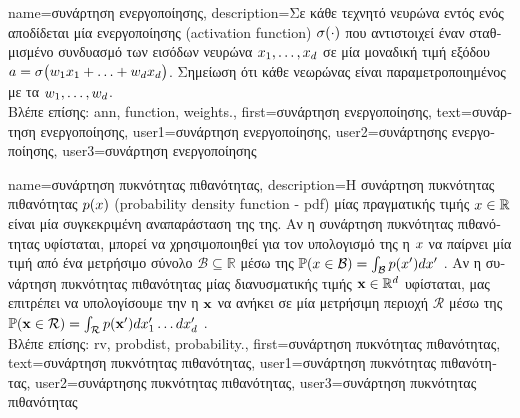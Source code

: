 {name={\foreignlanguage{greek}{συνάρτηση ενεργοποίησης}},
	description={\foreignlanguage{greek}{Σε κάθε τεχνητό νευρώνα εντός ενός} 
		 \foreignlanguage{greek}{αποδίδεται μία}  \foreignlanguage{greek}{ενεργοποίησης} (activation function)   
		$\sigma(\cdot)$ \foreignlanguage{greek}{που αντιστοιχεί έναν σταθμισμένο συνδυασμό των εισόδων 
		νευρώνα} $x_{1}, \ldots, x_{d}$ \foreignlanguage{greek}{σε μία μοναδική τιμή εξόδου} 
		$a = \sigma\big(w_{1} x_{1}+\ldots+w_{d} x_{d} \big)$. 
		\foreignlanguage{greek}{Σημείωση ότι κάθε νεωρώνας είναι παραμετροποιημένος με τα} 
		 $w_{1}, \ldots, w_{d}$.\\
		\foreignlanguage{greek}{Βλέπε επίσης:} \gls{ann}, \gls{function}, \gls{weights}.},
	first={\foreignlanguage{greek}{συνάρτηση ενεργοποίησης}},
	text={\foreignlanguage{greek}{συνάρτηση ενεργοποίησης}},
	user1={\foreignlanguage{greek}{συνάρτηση ενεργοποίησης}}, %
	user2={\foreignlanguage{greek}{συνάρτησης ενεργοποίησης}}, %
	user3={\foreignlanguage{greek}{συνάρτηση ενεργοποίησης}} %
}

{name={\foreignlanguage{greek}{συνάρτηση πυκνότητας πιθανότητας}},
	description={\foreignlanguage{greek}{Η συνάρτηση πυκνότητας πιθανότητας} 
		$p(x)$ (probability density function - pdf) \foreignlanguage{greek}{μίας}  \foreignlanguage{greek}{πραγματικής τιμής 
		$x \in \mathbb{R}$ είναι μία συγκεκριμένη αναπαράσταση της}  \foreignlanguage{greek}{της. 
		Αν η συνάρτηση πυκνότητας πιθανότητας υφίσταται, μπορεί να χρησιμοποιηθεί για τον υπολογισμό της}  
		\foreignlanguage{greek}{η $x$ να παίρνει μία τιμή από ένα μετρήσιμο σύνολο  
		$\mathcal{B} \subseteq \mathbb{R}$ μέσω της} $\mathbb{P}({x \in \mathcal{B}}) = \int_{\mathcal{B}} p(x') d x'$ 
		\cite[\foreignlanguage{greek}{Κεφ.} 3]{BertsekasProb}. 
		\foreignlanguage{greek}{Αν η συνάρτηση πυκνότητας πιθανότητας μίας}  \foreignlanguage{greek}{διανυσματικής τιμής 
		${\bf x} \in \mathbb{R}^{d}$ υφίσταται, μας επιτρέπει να υπολογίσουμε την}  
		\foreignlanguage{greek}{η ${\bf x}$ να ανήκει σε μία μετρήσιμη περιοχή $\mathcal{R}$ μέσω της} 
        		$\mathbb{P}({{\bf x} \in \mathcal{R}}) = \int_{\mathcal{R}} p({\bf x}') d x_{1}' \ldots d x_{d}' $ 
		\cite[\foreignlanguage{greek}{Κεφ.} 3]{BertsekasProb}.\\
        		\foreignlanguage{greek}{Βλέπε επίσης:} \gls{rv}, \gls{probdist}, \gls{probability}.},
	first={\foreignlanguage{greek}{συνάρτηση πυκνότητας πιθανότητας}},
	text={\foreignlanguage{greek}{συνάρτηση πυκνότητας πιθανότητας}},
	user1={\foreignlanguage{greek}{συνάρτηση πυκνότητας πιθανότητας}}, %
	user2={\foreignlanguage{greek}{συνάρτησης πυκνότητας πιθανότητας}}, %
	user3={\foreignlanguage{greek}{συνάρτηση πυκνότητας πιθανότητας}} %
}

